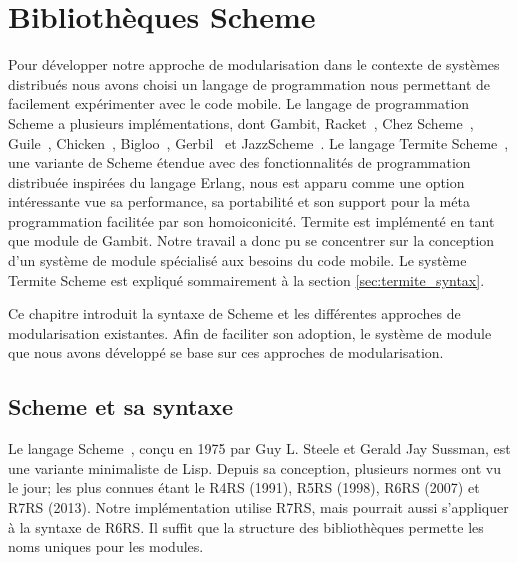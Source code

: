 
\chapter{Bibliothèques Scheme} \label{ch:scheme_concepts}
Pour développer notre approche de modularisation dans le contexte de systèmes
distribués nous avons choisi un langage de programmation nous permettant de
facilement expérimenter avec le code mobile. Le langage de programmation Scheme
a plusieurs implémentations, dont Gambit, Racket~\cite{Racket}, Chez
Scheme~\cite{dybvig2011chez}, Guile~\cite{galassi1996guile},
Chicken~\cite{chicken131practical}, Bigloo~\cite{Bigloo}, Gerbil~\cite{Gerbil} et
JazzScheme~\cite{JazzScheme}.  Le langage Termite
Scheme~\cite{DBLP:conf/erlang/Germain06}, une variante de Scheme étendue avec
des fonctionnalités de programmation distribuée inspirées du langage Erlang,
nous est apparu comme une option intéressante vue sa performance, sa
portabilité et son support pour la méta programmation facilitée par son
homoiconicité. Termite est implémenté en tant que module de Gambit.  Notre
travail a donc pu se concentrer sur la conception d'un système de module
spécialisé aux besoins du code mobile. Le système Termite Scheme est expliqué
sommairement à la section \ref{sec:termite_syntax}.

Ce chapitre introduit la syntaxe de Scheme et les différentes
approches de modularisation existantes.  Afin de faciliter son
adoption, le système de module que nous avons développé se base sur
ces approches de modularisation.


\section{Scheme et sa syntaxe}

Le langage Scheme~\cite{Clinger:2008:SCH:1529966.1529973}, conçu en 1975 par
Guy L. Steele et Gerald Jay Sussman, est une variante minimaliste de Lisp.
Depuis sa conception, plusieurs normes ont vu le jour; les plus connues étant
le R4RS (1991), R5RS (1998), R6RS (2007) et R7RS (2013). Notre implémentation
utilise R7RS, mais pourrait aussi s'appliquer à la syntaxe de
R6RS. Il suffit que la structure des bibliothèques permette les noms uniques
pour les modules.

